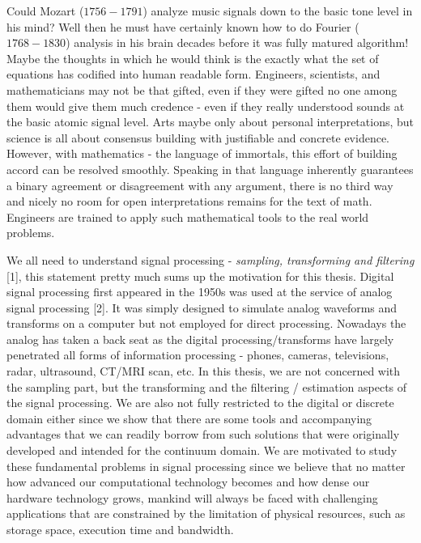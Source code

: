 \documentclass{UCF_ETD}
\begin{document}
Could Mozart ($1756 - 1791$)  analyze music signals down to the basic tone level in his mind? Well then he must have certainly known how to do Fourier ($1768 - 1830$) analysis in his brain decades before it was fully matured algorithm! Maybe the thoughts in which he would think is the exactly what the set of equations has codified into human readable form. Engineers, scientists, and mathematicians may not be that gifted, even if they were gifted no one among them would give them much credence - even if they really understood sounds at the basic atomic signal level. Arts maybe only about personal interpretations, but science is all about consensus building with justifiable and concrete evidence. However, with mathematics - the language of immortals, this effort of building accord can be resolved smoothly. Speaking in that language inherently guarantees a binary agreement or disagreement with any argument, there is no third way and nicely no room for open interpretations remains for the text of math. Engineers are trained to apply such mathematical tools to the real world problems.  

We all need to understand signal processing - \emph{sampling, transforming and filtering} [1], this statement pretty much sums up the motivation for this thesis. Digital signal processing first appeared in the 1950s was used at the service of analog signal processing [2]. It was simply designed to simulate analog waveforms and transforms on a computer but not employed for direct processing. Nowadays the analog has taken a back seat as the digital processing/transforms have largely penetrated all forms of information processing - phones, cameras, televisions, radar, ultrasound, CT/MRI scan, etc. In this thesis, we are not concerned with the sampling part,
but the transforming and the filtering / estimation aspects of the signal processing. We are also not fully restricted to the digital or discrete domain either since we show that there are some tools and accompanying advantages that we can readily borrow from such solutions that were originally developed and intended for the continuum domain. We are motivated to study these fundamental problems in signal processing since we believe that no matter how advanced our computational technology becomes and how dense our hardware technology grows, mankind will always be faced with challenging applications that are constrained by the limitation of physical resources, such as storage space, execution time and bandwidth.
\end{document}

